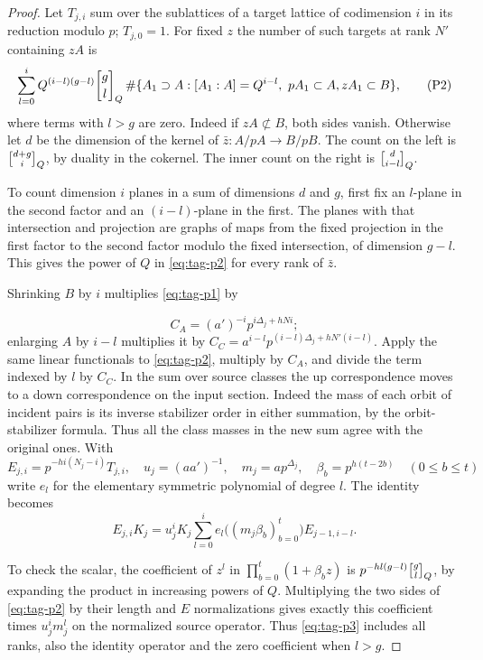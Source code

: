 \begin{proof}

Let \(T_{j,i}\) sum over the sublattices of a target lattice of
codimension \(i\) in its reduction modulo \(p\); \(T_{j,0}=1\).
For fixed \(z\) the number of such targets at rank \(N'\)
containing \(zA\) is
\[
 \sum_{l=0}^i Q^{(i-l)(g-l)}
 \hecbin{g}{l}\,
 \#\{A_1\supset A:[A_1:A]=Q^{i-l},\ pA_1\subset A,                                      zA_1\subset B\},
 \tag{P2}\label{eq:tag-p2}
\]
where terms with \(l>g\) are zero. Indeed if \(zA\not\subset B\),
both sides vanish. Otherwise let \(d\) be the dimension of the
kernel of \(\bar z:A/pA\to B/pB\). The count on the left is
\(\hecbin{d+g}{i}\), by duality in the cokernel. The inner
count on the right is \(\hecbin{d}{i-l}\).

To count dimension
\(i\) planes in a sum of dimensions \(d\) and \(g\), first fix
an \(l\)-plane in the second factor and an \((i-l)\)-plane in
the first. The planes with that intersection and projection are
graphs of maps from the fixed projection in the first factor to
the second factor modulo the fixed intersection, of dimension \(g-l\). This gives
the power of \(Q\) in \eqref{eq:tag-p2} for every rank of \(\bar z\).


Shrinking \(B\) by \(i\) multiplies \eqref{eq:tag-p1} by

\[
  C_A=(a')^{-i}p^{i\Delta_j+hNi};
\]
 enlarging \(A\) by
\(i-l\) multiplies it by
\(C_C=a^{i-l}p^{(i-l)\Delta_j+hN'(i-l)}\).
Apply the same linear functionals to \eqref{eq:tag-p2}, multiply by \(C_A\),
and divide the term indexed by \(l\) by \(C_C\).
In the sum over source classes the up correspondence moves to a
down correspondence on the input section. Indeed the mass of
each orbit of incident pairs is its inverse stabilizer order in
either summation, by the orbit-stabilizer formula. Thus all the
class masses in the new sum agree with the original ones. With
\[
 E_{j,i}=p^{-hi(N_j-i)}T_{j,i},\quad
 u_j=(aa')^{-1},\quad m_j=a p^{\Delta_j},\quad
 \beta_b=p^{h(t-2b)}\quad(0\le b\le t)
\]
write \(e_l\) for the elementary symmetric polynomial of degree
\(l\). The identity becomes
\[
 E_{j,i}K_j
 =u_j^i K_j\sum_{l=0}^i
       e_l\big((m_j\beta_b)_{b=0}^t\big) E_{j-1,i-l}.
 \tag{P3}\label{eq:tag-p3}
\]

To check the scalar, the
coefficient of \(z^l\) in \(\prod_{b=0}^t(1+\beta_b z)\)
is \(p^{-h l(g-l)}\hecbin{g}{l}\), by expanding the product
in increasing powers of \(Q\). Multiplying the two sides of
\eqref{eq:tag-p2} by their length and \(E\) normalizations gives exactly
this coefficient times \(u_j^i m_j^l\) on the normalized
source operator. Thus \eqref{eq:tag-p3} includes all ranks, also the identity
operator and the zero coefficient when \(l>g\).

\end{proof}

